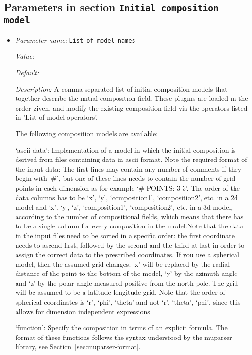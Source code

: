\subsection{Parameters in section \tt Initial composition model}
\label{parameters:Initial_20composition_20model}

\begin{itemize}
\item {\it Parameter name:} {\tt List of model names}
\label{parameters:Initial composition model/List of model names}


{\it Value:} 


{\it Default:} 


{\it Description:} A comma-separated list of initial composition models that together describe the initial composition field. These plugins are loaded in the order given, and modify the existing composition field via the operators listed in 'List of model operators'.

The following composition models are available:

`ascii data': Implementation of a model in which the initial composition is derived from files containing data in ascii format. Note the required format of the input data: The first lines may contain any number of comments if they begin with `\#', but one of these lines needs to contain the number of grid points in each dimension as for example `\# POINTS: 3 3'. The order of the data columns has to be `x', `y', `composition1', `composition2', etc. in a 2d model and `x', `y', `z', `composition1', `composition2', etc. in a 3d model, according to the number of compositional fields, which means that there has to be a single column for every composition in the model.Note that the data in the input files need to be sorted in a specific order: the first coordinate needs to ascend first, followed by the second and the third at last in order to assign the correct data to the prescribed coordinates. If you use a spherical model, then the assumed grid changes. `x' will be replaced by the radial distance of the point to the bottom of the model, `y' by the azimuth angle and `z' by the polar angle measured positive from the north pole. The grid will be assumed to be a latitude-longitude grid. Note that the order of spherical coordinates is `r', `phi', `theta' and not `r', `theta', `phi', since this allows for dimension independent expressions.

`function': Specify the composition in terms of an explicit formula. The format of these functions follows the syntax understood by the muparser library, see Section~\ref{sec:muparser-format}.


\end{itemize}
